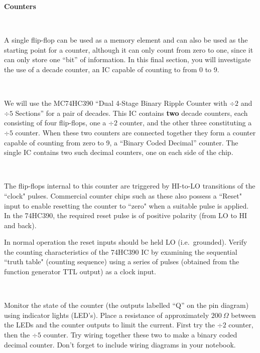 \documentclass[12pt,oneside,openany,letterpaper]{article}
\begin{document}
\clearpage

{\large{\bf Counters}}

~

\noindent A single flip-flop can be used as a memory element and can also be used as the starting
point for a counter, although it can only count from zero to one, since it can only store
one “bit” of information. In this final section, you will investigate the use of a decade
counter, an IC capable of counting to from 0 to 9.

~

\noindent We will use the MC74HC390 ``Dual 4-Stage Binary Ripple Counter with $\div 2$ and $\div 5$
Sections'' for a pair of decades. This IC contains {\bf two} decade counters, each consisting
of four flip-flops, one a $\div 2$ counter, and the other three constituting a $\div 5$ counter. When these two counters are connected together they form a counter capable of counting from
zero to 9, a ``Binary Coded Decimal'' counter.  The single IC contains two such decimal counters, one on each side of the chip.

~

\noindent The flip-flops internal to this counter are triggered by HI-to-LO transitions of the
``clock" pulses. Commercial counter chips such as these also possess a ``Reset" input to
enable resetting the counter to ``zero" when a suitable pulse is applied. In the 74HC390, the required reset pulse is of positive polarity (from LO to HI and back).  

In normal operation the reset inputs should be held LO (i.e.\ grounded).
Verify the counting characteristics of the 74HC390 IC by examining the sequential ``truth table" (counting sequence) using a series of pulses (obtained from the function
generator TTL output) as a clock input.

~

\noindent Monitor the state of the counter (the outputs labelled “Q” on the pin diagram) using
indicator lights (LED’s). Place a resistance of approximately $200~\Omega$ between the LEDs
and the counter outputs to limit the current. First try the $\div 2$ counter, then the $\div 5$ counter.
Try wiring together these two to make a binary coded decimal counter. Don't forget to include wiring diagrams
in your notebook.
\end{document}
